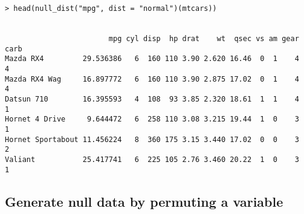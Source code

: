 \begin{verbatim}
> head(null_dist("mpg", dist = "normal")(mtcars))


                        mpg cyl disp  hp drat    wt  qsec vs am gear carb
Mazda RX4         29.536386   6  160 110 3.90 2.620 16.46  0  1    4    4
Mazda RX4 Wag     16.897772   6  160 110 3.90 2.875 17.02  0  1    4    4
Datsun 710        16.395593   4  108  93 3.85 2.320 18.61  1  1    4    1
Hornet 4 Drive     9.644472   6  258 110 3.08 3.215 19.44  1  0    3    1
Hornet Sportabout 11.456224   8  360 175 3.15 3.440 17.02  0  0    3    2
Valiant           25.417741   6  225 105 2.76 3.460 20.22  1  0    3    1
\end{verbatim}


\subsection{Generate null data by permuting a
variable}\label{generate-null-data-by-permuting-a-variable}

